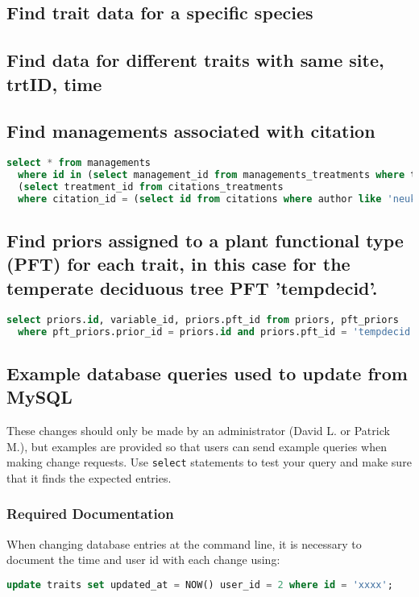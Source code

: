 \begin{enumerate}
\subsection{Find trait data for a specific species}

\subsection{Find data for different traits with same site, trtID, time}


\subsection{Find managements associated with citation}
\begin{lstlisting}[language=SQL]
  select * from managements 
  where id in (select management_id from managements_treatments where treatment_id in 
  (select treatment_id from citations_treatments 
  where citation_id = (select id from citations where author like 'neukirchen'));
\end{lstlisting}


\subsection{Find priors assigned to a plant functional type (PFT) for each trait, in this case for the temperate deciduous tree PFT 'tempdecid'.}
\begin{lstlisting}[language=SQL]
  select priors.id, variable_id, priors.pft_id from priors, pft_priors 
  where pft_priors.prior_id = priors.id and priors.pft_id = 'tempdecid'; 
\end{lstlisting}

\subsection{Example database queries used to update from MySQL}
These changes should only be made by an administrator (David L. or Patrick M.), but examples are provided so that users can send example queries when making change requests. Use \verb+select+ statements to test your query and make sure that it finds the expected entries.
\subsubsection{Required Documentation}
When changing database entries at the command line, it is necessary to document the time and user id with each change using:
\begin{lstlisting}[language=SQL]
  update traits set updated_at = NOW() user_id = 2 where id = 'xxxx';
\end{lstlisting}


\end{enumerate}
